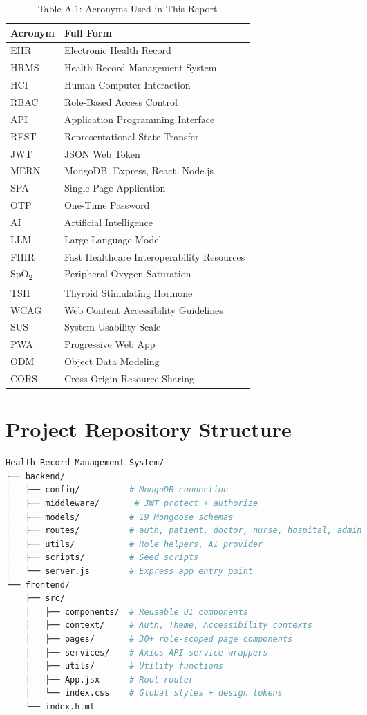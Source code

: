 \documentclass[12pt,a4paper]{report}
\begin{document}
\begin{table}[H]
\centering
\caption{Table A.1: Acronyms Used in This Report}
\begin{tabular}{ll}
\toprule
\textbf{Acronym} & \textbf{Full Form} \\
\midrule
EHR     & Electronic Health Record \\
HRMS    & Health Record Management System \\
HCI     & Human Computer Interaction \\
RBAC    & Role-Based Access Control \\
API     & Application Programming Interface \\
REST    & Representational State Transfer \\
JWT     & JSON Web Token \\
MERN    & MongoDB, Express, React, Node.js \\
SPA     & Single Page Application \\
OTP     & One-Time Password \\
AI      & Artificial Intelligence \\
LLM     & Large Language Model \\
FHIR    & Fast Healthcare Interoperability Resources \\
SpO\textsubscript{2}   & Peripheral Oxygen Saturation \\
TSH     & Thyroid Stimulating Hormone \\
WCAG    & Web Content Accessibility Guidelines \\
SUS     & System Usability Scale \\
PWA     & Progressive Web App \\
ODM     & Object Data Modeling \\
CORS    & Cross-Origin Resource Sharing \\
\bottomrule
\end{tabular}
\end{table}

\section{Project Repository Structure}

\begin{lstlisting}[language=bash, caption=Project Directory Structure]
Health-Record-Management-System/
├── backend/
│   ├── config/          # MongoDB connection
│   ├── middleware/       # JWT protect + authorize
│   ├── models/          # 19 Mongoose schemas
│   ├── routes/          # auth, patient, doctor, nurse, hospital, admin
│   ├── utils/           # Role helpers, AI provider
│   ├── scripts/         # Seed scripts
│   └── server.js        # Express app entry point
└── frontend/
    ├── src/
    │   ├── components/  # Reusable UI components
    │   ├── context/     # Auth, Theme, Accessibility contexts
    │   ├── pages/       # 30+ role-scoped page components
    │   ├── services/    # Axios API service wrappers
    │   ├── utils/       # Utility functions
    │   ├── App.jsx      # Root router
    │   └── index.css    # Global styles + design tokens
    └── index.html
\end{lstlisting}
\end{document}
